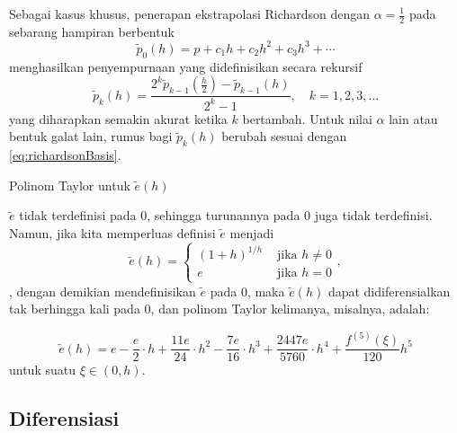 Sebagai kasus khusus, penerapan ekstrapolasi Richardson dengan $\alpha=\frac{1}{2}$
pada sebarang hampiran berbentuk
\[
\tilde{p}_{0}(h)=p+c_{1}h+c_{2}h^{2}+c_{3}h^{3}+\cdots
\]
menghasilkan penyempurnaan yang didefinisikan secara rekursif
\[
\tilde{p}_{k}(h)=\frac{2^{k}\tilde{p}_{k-1}\left(\frac{h}{2}\right)-\tilde{p}_{k-1}(h)}{2^{k}-1},\quad k=1,2,3,\ldots
\]
yang diharapkan semakin akurat ketika $k$ bertambah. Untuk nilai
$\alpha$ lain atau bentuk galat lain, rumus bagi $\tilde{p}_{k}(h)$
berubah sesuai dengan \ref{eq:richardsonBasis}.

\noindent\begin{digression}{Polinom Taylor untuk $\tilde e(h)$} \label{crumpet:eApproximate}

\noindent$\tilde{e}$ tidak terdefinisi pada $0$, sehingga turunannya
pada $0$ juga tidak terdefinisi. Namun, jika kita memperluas definisi
$\tilde{e}$ menjadi
\[
\tilde{e}(h)=\begin{cases}
(1+h)^{1/h} & \mbox{ jika }h\neq0\\
e & \mbox{ jika }h=0
\end{cases},
\]
, dengan demikian mendefinisikan $\tilde{e}$ pada $0$, maka $\tilde{e}(h)$
dapat didiferensialkan tak berhingga kali pada $0$, dan polinom Taylor
kelimanya, misalnya, adalah:

\noindent
\[
\tilde{e}(h)=e-\frac{e}{2}\cdot h+\frac{11e}{24}\cdot h^{2}-\frac{7e}{16}\cdot h^{3}+\frac{2447e}{5760}\cdot h^{4}+\frac{f^{(5)}(\xi)}{120}h^{5}
\]
untuk suatu $\xi\in(0,h)$.

\noindent\end{digression} 

\subsection{Diferensiasi}

